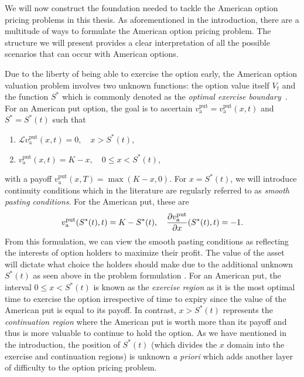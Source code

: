 We will now construct the foundation needed to tackle the American option pricing problems in this thesis.
As aforementioned in the introduction, there are a multitude of ways to formulate the American option pricing problem.
The structure we will present provides a clear interpretation of all the possible scenarios that can occur with American options.

Due to the liberty of being able to exercise the option early, the American option valuation problem involves two unknown functions: the option value itself $V_t$ and
the function $S^*$ which is commonly denoted as the \emph{optimal exercise boundary}~\cite{Kwok2008}. For an American put option, the goal is to ascertain
$v_\text{a}^{\text{put}} =v_\text{a}^{\text{put}}(x,t)$ and $S^* = S^*(t)$ such that
	\begin{enumerate}
			\item $\mathscr{L}v_\text{a}^{\text{put}}(x,t) = 0, \quad x > S^*(t)$,
			\item $v_\text{a}^{\text{put}}(x,t) = K - x, \quad 0 \leq x < S^*(t)$,
	\end{enumerate}
	with a payoff $v_\text{a}^{\text{put}}(x,T) = \max(K-x,0)$. For $x = S^*(t)$, we will introduce continuity conditions which in the literature are regularly referred to as \emph{smooth pasting conditions}. For the American put, these are
		\begin{equation*}
			v_\text{a}^{\text{put}}(S^*(t),t) = K - S^*(t), \quad \frac{\partial v_\text{a}^{\text{put}}}{\partial x}(S^*(t),t) = -1.
		\end{equation*}
	From this formulation, we can view the smooth pasting conditions as reflecting the interests of option holders to maximize their profit. The value of the asset will dictate what choice the holders should make due to the additional unknown $S^*(t)$ as seen above in the problem formulation . For an American put, the interval $0 \leq x < S^*(t)$ is known as the \emph{exercise region} as it is the most optimal time to exercise the option irrespective of time to expiry since the value of the American put is equal to its payoff. In contrast, $x > S^*(t)$ represents the \emph{continuation region} where the American put is worth more than its payoff and thus is more valuable to continue to hold the option. As we have mentioned in the introduction, the position of $S^*(t)$ (which divides the $x$ domain into the exercise and continuation regions) is unknown \emph{a priori} which adds another layer of difficulty to the option pricing problem.
	
